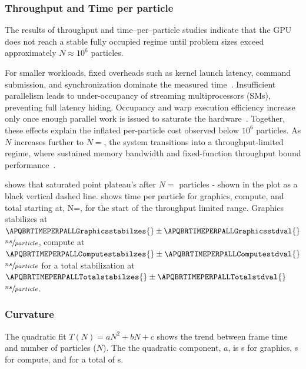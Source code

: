 


\subsubsection{Throughput and Time per particle}

The results of throughput and time–per–particle studies indicate that the GPU does not reach a stable fully occupied regime until problem sizes exceed approximately $N \!\approx\! 10^{6}$ particles.


For smaller workloads, fixed overheads such as kernel launch latency, command submission, and synchronization dominate the measured time~\cite{zhang2019overheads, chen2015freelaunch}. Insufficient parallelism leads to under-occupancy of streaming multiprocessors (SMs), preventing full latency hiding. Occupancy and warp execution efficiency increase only once enough parallel work is issued to saturate the hardware~\cite{nvidia2020occupancy,GPUOccupancy}. Together, these effects explain the inflated per-particle cost observed below $10^{6}$ particles. As $N$ increases further to $N=$\numprint{\APQBRTIMEPERPALLstartval{}}, the system transitions into a throughput-limited regime, where sustained memory bandwidth and fixed-function throughput bound performance~\cite{lustig2013reducing}. 



 shows that saturated point plateau's after $N=$\numprint{\APQBRTIMEPERPALLstartval{}} particles - shown in the plot as a black vertical dashed line.  shows time per particle for graphics, compute, and total starting at, N=\numprint{\APQBRTIMEPERPALLstartval{}}, for the start of the throughput limited range. Graphics stabilizes at $\APQBRTIMEPERPALLGraphicsstabilzes{}  \pm \APQBRTIMEPERPALLGraphicsstdval{} $ $\sfrac{ns}{particle}$, compute at $\APQBRTIMEPERPALLComputestabilzes{} \pm \APQBRTIMEPERPALLComputestdval{}$ $\sfrac{ns}{particle}$ for a total stabilization at $\APQBRTIMEPERPALLTotalstabilzes{} \pm \APQBRTIMEPERPALLTotalstdval{}$ $\sfrac{ns}{particle}$. 

\subsubsection{Curvature}

The quadratic fit $T(N) = aN^2 + bN + c$ shows the trend between frame time and number of particles ($N$). The the quadratic component, $a$, is \APBQRCURVATUREgmsa{}s for graphics, \APBQRCURVATUREcmsa{}s for compute, and for a total of \APBQRCURVATUREtota{}s. 

